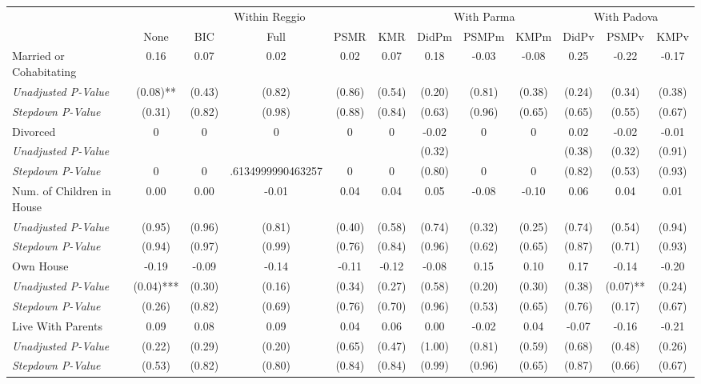 \begin{tabular}{l c c c c c c c c c c c}
\toprule
& \multicolumn{5}{c}{Within Reggio} & \multicolumn{3}{c}{With Parma} & \multicolumn{3}{c}{With Padova} \\\cmidrule(lr){2-6} \cmidrule(lr){7-9} \cmidrule(lr){10-12}
 & None & BIC & Full & PSMR & KMR & DidPm & PSMPm & KMPm & DidPv & PSMPv & KMPv \\
\midrule
Married or Cohabitating & 0.16 & 0.07 & 0.02 & 0.02 & 0.07 & 0.18 & -0.03 & -0.08 & 0.25 & -0.22 & -0.17 \\
\quad \textit{Unadjusted P-Value} & (0.08)** & (0.43) & (0.82) & (0.86) & (0.54) & (0.20) & (0.81) & (0.38) & (0.24) & (0.34) & (0.38) \\
\quad \textit{Stepdown P-Value} & (0.31) & (0.82) & (0.98) & (0.88) & (0.84) & (0.63) & (0.96) & (0.65) & (0.65) & (0.55) & (0.67) \\
Divorced & 0 & 0 & 0 & 0 & 0 & -0.02 & 0 & 0 & 0.02 & -0.02 & -0.01 \\
\quad \textit{Unadjusted P-Value} & & & & & & (0.32) & & & (0.38) & (0.32) & (0.91) \\
\quad \textit{Stepdown P-Value} & 0 & 0 & .6134999990463257 & 0 & 0 & (0.80) & 0 & 0 & (0.82) & (0.53) & (0.93) \\
Num. of Children in House & 0.00 & 0.00 & -0.01 & 0.04 & 0.04 & 0.05 & -0.08 & -0.10 & 0.06 & 0.04 & 0.01 \\
\quad \textit{Unadjusted P-Value} & (0.95) & (0.96) & (0.81) & (0.40) & (0.58) & (0.74) & (0.32) & (0.25) & (0.74) & (0.54) & (0.94) \\
\quad \textit{Stepdown P-Value} & (0.94) & (0.97) & (0.99) & (0.76) & (0.84) & (0.96) & (0.62) & (0.65) & (0.87) & (0.71) & (0.93) \\
Own House & -0.19 & -0.09 & -0.14 & -0.11 & -0.12 & -0.08 & 0.15 & 0.10 & 0.17 & -0.14 & -0.20 \\
\quad \textit{Unadjusted P-Value} & (0.04)*** & (0.30) & (0.16) & (0.34) & (0.27) & (0.58) & (0.20) & (0.30) & (0.38) & (0.07)** & (0.24) \\
\quad \textit{Stepdown P-Value} & (0.26) & (0.82) & (0.69) & (0.76) & (0.70) & (0.96) & (0.53) & (0.65) & (0.76) & (0.17) & (0.67) \\
Live With Parents & 0.09 & 0.08 & 0.09 & 0.04 & 0.06 & 0.00 & -0.02 & 0.04 & -0.07 & -0.16 & -0.21 \\
\quad \textit{Unadjusted P-Value} & (0.22) & (0.29) & (0.20) & (0.65) & (0.47) & (1.00) & (0.81) & (0.59) & (0.68) & (0.48) & (0.26) \\
\quad \textit{Stepdown P-Value} & (0.53) & (0.82) & (0.80) & (0.84) & (0.84) & (0.99) & (0.96) & (0.65) & (0.87) & (0.66) & (0.67) \\
\bottomrule
\end{tabular}
